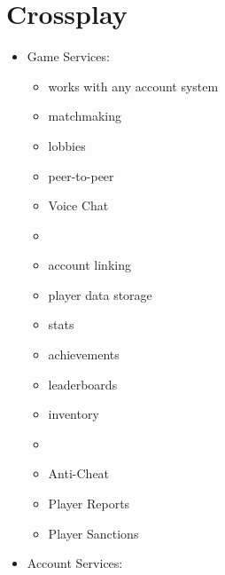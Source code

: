     \section{Crossplay}
        \begin{itemize}
            \item Game Services: 
            \begin{itemize}
                \item works with any account system
                \item matchmaking
                \item lobbies
                \item peer-to-peer
                \item Voice Chat
                \item 
                \item account linking
                \item player data storage
                \item stats
                \item achievements
                \item leaderboards
                \item inventory
                \item 
                \item Anti-Cheat
                \item Player Reports
                \item Player Sanctions
            \end{itemize}
            \item Account Services: 
        \end{itemize}
